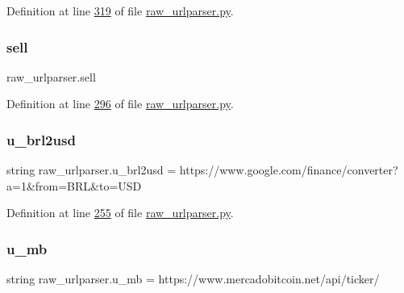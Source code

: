 Definition at line \hyperlink{raw__urlparser_8py_source_l00319}{319} of file \hyperlink{raw__urlparser_8py_source}{raw\+\_\+urlparser.\+py}.

\mbox{\label{namespaceraw__urlparser_a9f1ba2a5cd520bb41ac4bee751047679}} 
\subsubsection{\texorpdfstring{sell}{sell}}
{\footnotesize\ttfamily raw\+\_\+urlparser.\+sell}



Definition at line \hyperlink{raw__urlparser_8py_source_l00296}{296} of file \hyperlink{raw__urlparser_8py_source}{raw\+\_\+urlparser.\+py}.

\mbox{\label{namespaceraw__urlparser_a876711ddd7ebb3991a35cc1768d1d22c}} 
\subsubsection{\texorpdfstring{u\+\_\+brl2usd}{u\_brl2usd}}
{\footnotesize\ttfamily string raw\+\_\+urlparser.\+u\+\_\+brl2usd = \textquotesingle{}https\+://www.\+google.\+com/finance/converter?a=1\&from=B\+RL\&to=U\+SD\textquotesingle{}}



Definition at line \hyperlink{raw__urlparser_8py_source_l00255}{255} of file \hyperlink{raw__urlparser_8py_source}{raw\+\_\+urlparser.\+py}.

\mbox{\label{namespaceraw__urlparser_a9a840f174b92a24c415b88c87e84b73d}} 
\subsubsection{\texorpdfstring{u\+\_\+mb}{u\_mb}}
{\footnotesize\ttfamily string raw\+\_\+urlparser.\+u\+\_\+mb = \textquotesingle{}https\+://www.\+mercadobitcoin.\+net/api/ticker/\textquotesingle{}}



